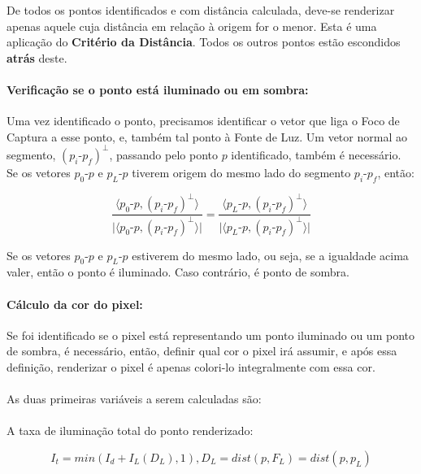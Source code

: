 \documentclass{article}
\begin{document}
	De todos os pontos identificados e com distância calculada, deve-se renderizar apenas aquele cuja distância em relação à origem for o menor. Esta é uma aplicação do \textbf{Critério da Distância}. Todos os outros pontos estão escondidos \textbf{atrás} deste.
	
	\paragraph{Verificação se o ponto está iluminado ou em sombra:}
	Uma vez identificado o ponto, precisamos identificar o vetor que liga o Foco de Captura a esse ponto, e, também tal ponto à Fonte de Luz. Um vetor normal ao segmento,  $(p_i\text{-}p_f)^\bot$, passando pelo ponto $p$ identificado, também é necessário. Se os vetores $p_0$-$p$ e $p_{L}$-$p$ tiverem origem do mesmo lado do segmento $p_i$-$p_f$, então:
	
	$$\frac{\langle p_0\text{-}p , (p_i\text{-}p_f)^\bot \rangle}{\lvert \langle p_0\text{-}p , (p_i\text{-}p_f)^\bot \rangle \rvert} = \frac{\langle p_L\text{-}p , (p_i\text{-}p_f)^\bot \rangle}{\lvert \langle p_L\text{-}p , (p_i\text{-}p_f)^\bot \rangle \rvert}$$
	
	Se os vetores $p_0\text{-}p$ e $p_L\text{-}p$ estiverem do mesmo lado, ou seja, se a igualdade acima valer, então o ponto é iluminado. Caso contrário, é ponto de sombra.
	
	\paragraph{Cálculo da cor do pixel: }
	Se foi identificado se o pixel está representando um ponto iluminado ou um ponto de sombra, é necessário, então, definir qual cor o pixel irá assumir, e após essa definição, renderizar o pixel é apenas colori-lo integralmente com essa cor.
	
	\paragraph{}
	As duas primeiras variáveis a serem calculadas são:
	
	\paragraph{}
	A taxa de iluminação total do ponto renderizado: 
	
	\begin{equation} \label{eq:2}
	I_t = min(I_d + I_L(D_L), 1), D_L = dist(p, F_L) = dist(p, p_L)
	\end{equation}
	
\end{document}

